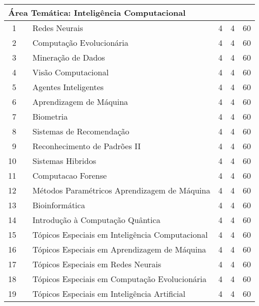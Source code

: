 \documentclass[
	12pt,				%
	openright,			%
  oneside,     %
	a4paper,			%
	english,			%
	french,				%
	spanish,			%
	brazil				%
	]{abntex2}
\begin{document}
\begin{apendicesenv}
\begin{longtable}{r|r|l|r|r|r}
\multicolumn{6}{l}{\textbf{Área Temática: Inteligência Computacional} }  \\ \hline
    1     &       & Redes Neurais & 4     & 4     & 60 \\ \hline
    2     &       & Computação Evolucionária & 4     & 4     & 60 \\ \hline
    3     &       & Mineração de Dados & 4     & 4     & 60 \\ \hline
    4     &       & Visão Computacional & 4     & 4     & 60 \\ \hline
    5     &       & Agentes Inteligentes & 4     & 4     & 60 \\ \hline
    6     &       & Aprendizagem de Máquina & 4     & 4     & 60 \\ \hline
    7     &       & Biometria & 4     & 4     & 60 \\ \hline
    8     &       & Sistemas de Recomendação & 4     & 4     & 60 \\ \hline
    9     &       & Reconhecimento de Padrões II & 4     & 4     & 60 \\ \hline
    10    &       & Sistemas Hibridos & 4     & 4     & 60 \\ \hline
    11    &       & Computacao Forense & 4     & 4     & 60 \\ \hline
    12    &       & \small{Métodos Paramétricos Aprendizagem de Máquina} & 4     & 4     & 60 \\ \hline
    13    &       & Bioinformática & 4     & 4     & 60 \\ \hline
    14    &       & Introdução à Computação Quântica & 4    & 4 & 60 \\ \hline 
    15    &       & \small{Tópicos Especiais em Inteligência Computacional} & 4     & 4     & 60 \\ \hline
    16    &       & \small{Tópicos Especiais em Aprendizagem de Máquina} & 4     & 4     & 60 \\ \hline
    17    &       & \small{Tópicos Especiais em Redes Neurais} & 4     & 4     & 60 \\ \hline
    18    &       & \small{Tópicos Especiais em Computação Evolucionária} & 4     & 4     & 60 \\ \hline
    19    &       & \small{Tópicos Especiais em Inteligência Artificial} & 4     & 4     & 60 \\ \hline


\end{longtable}
\end{apendicesenv}
\end{document}
